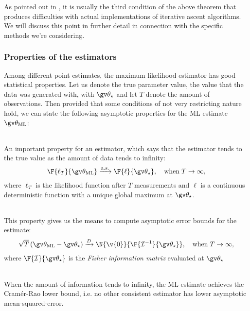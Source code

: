 As pointed out in \textcite{luenberger2008}, it is usually the third condition
of the above theorem that produces difficulties with actual implementations
of iterative ascent algorithms. We will discuss this point in further detail in connection
with the specific methods we're considering.


\subsubsection{Properties of the estimators}
Among different point estimates, the maximum likelihood estimator has good statistical properties.
Let us denote the true parameter value, the value that the data was generated with, with $\Th_\star$ and 
let $T$ denote the amount of observations.
Then provided that some conditions of not very restricting nature hold, we can state the following asymptotic properties 
for the ML estimate $\Th_{\text{ML}}$:
\begin{description}
\addtolength{\leftskip}{1cm}
\item[Strong consistency]\hfill\\
An important property for an estimator, which says that
the estimator tends to the true value as the amount of data tends to infinity:
\begin{align}
	\F{\ell_T}{\Th_{\text{ML}}} \xrightarrow{\mathrm{a.s.}} \F{\ell}{\Th_\star},\quad \mathrm{when}\;T\to\infty,
\end{align}
where $\ell_T$ is the likelihood function after $T$ measurements and $\ell$ is a continuous
deterministic function with a unique global maximum at $\Th_\star$.
\item[Asymptotic normality]\hfill\\
This property gives us the means to compute asymptotic error bounds for
the estimate:
\begin{align}
	\sqrt{T}\left(\Th_{\text{ML}}-\Th_\star\right) \xrightarrow{D} \N{\v{0}}{\F{\mathcal{I}^{-1}}{\Th_\star}},\quad \mathrm{when}\;T\to\infty,	
\end{align}
where $\F{\mathcal{I}}{\Th_\star}$ is the \emph{Fisher information matrix} evaluated at $\Th_\star$ 
\item[Efficiency]\hfill\\
When the amount of information tends to infinity, the ML-estimate achieves
the Cramér-Rao lower bound, i.e. no other consistent estimator has lower asymptotic mean-squared-error.
\end{description}



